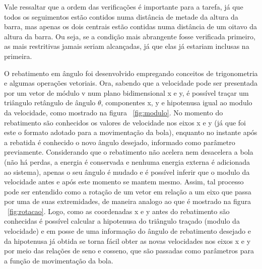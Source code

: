 \documentclass[conference]{IEEEtran}
\begin{document}
Vale ressaltar que a ordem das verificações é importante para a tarefa, já que todos os seguimentos estão contidos numa distância de metade da altura da barra, mas apenas os dois centrais estão contidas numa distância de um oitavo da altura da barra. Ou seja, se a condição mais abrangente fosse verificada primeiro, as mais restritivas jamais seriam alcançadas, já que elas já estariam inclusas na primeira.

O rebatimento em ângulo foi desenvolvido empregando conceitos de trigonometria e algumas operações vetoriais. Ora, sabendo que a velocidade pode ser presentada por um vetor de módulo v num plano bidimensional x e y, é possível traçar um triângulo retângulo de ângulo $\theta$, componentes x, y e hipotenusa igual ao modulo da velocidade, como mostrado na figura ~\ref{fig:modulo}. No momento do rebatimento são conhecidos os valores de velocidade nos eixos x e y (já que foi este o formato adotado para a movimentação da bola), enquanto no instante após a rebatida é conhecido o novo ângulo desejado, informado como parâmetro previamente. Considerando que o rebatimento não acelera nem desacelera a bola (não há perdas, a energia é conservada e nenhuma energia externa é adicionada ao sistema), apenas o seu ângulo é mudado e é possível inferir que o modulo da velocidade antes e após este momento se mantem mesmo. Assim, tal processo pode ser entendido como a rotação de um vetor em relação a um eixo que passa por uma de suas extremidades, de maneira analogo ao que é mostrado na figura ~\ref{fig:rotacao}. Logo, como as coordenadas x e y antes do rebatimento são conhecidas é possível calcular a hipotenusa do triângulo traçado (modulo da velocidade) e em posse de uma informação do ângulo de rebatimento desejado e da hipotenusa já obtida se torna fácil obter as novas velocidades nos eixos x e y por meio das relações de seno e cosseno, que são passadas como parâmetros para a função de movimentação da bola.
\end{document}
